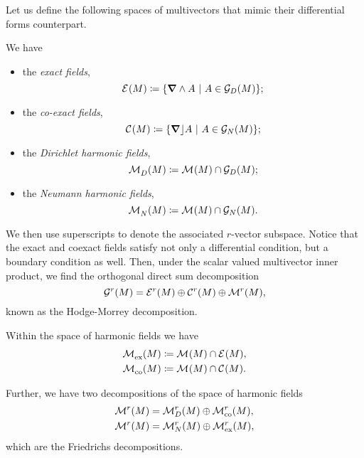 Let us define the following spaces of multivectors that mimic their differential forms counterpart.
\begin{definition}
We have
\begin{itemize}
    \item the \emph{exact fields},
    \begin{equation}
        \mathcal{E}^{}(M)\coloneqq \{\boldsymbol{\nabla} \wedge A ~\vert~ A \in \mathcal{G}_D(M)\};
    \end{equation}
    \item the \emph{co-exact fields},
    \begin{equation}
        \mathcal{C}^{}(M)\coloneqq \{\boldsymbol{\nabla} \rfloor A ~\vert~ A \in \mathcal{G}_N(M)\};
    \end{equation}
    \item the \emph{Dirichlet harmonic fields},
    \begin{equation}
        \mathcal{M}^{}_D(M)\coloneqq \mathcal{M}^{}(M) \cap \mathcal{G}_D(M);
    \end{equation}
    \item the \emph{Neumann harmonic fields},
    \begin{equation}
        \mathcal{M}^{}_N(M)\coloneqq \mathcal{M}^{}(M) \cap \mathcal{G}_N(M).
    \end{equation}
\end{itemize}
\end{definition}
We then use superscripts to denote the associated $r$-vector subspace. Notice that the exact and coexact fields satisfy not only a differential condition, but a boundary condition as well. Then, under the scalar valued multivector inner product, we find the orthogonal direct sum decomposition
\begin{equation}
\mathcal{G}^r(M) = \mathcal{E}^{r}(M) \oplus \mathcal{C}^{r}(M) \oplus \mathcal{M}^{r}(M),
\end{equation}
known as the Hodge-Morrey decomposition.
\begin{definition}
Within the space of harmonic fields we have
\begin{align}
    \mathcal{M}^{}_{\textrm{ex}}(M) &\coloneqq \mathcal{M}^{}(M)\cap \mathcal{E}^{}(M),\\
    \mathcal{M}^{}_{\textrm{co}}(M) &\coloneqq \mathcal{M}^{}(M) \cap \mathcal{C}^{}(M).
\end{align}
\end{definition}
Further, we have two decompositions of the space of harmonic fields 
\begin{align}
    \mathcal{M}^{r}(M) &= \mathcal{M}^{r}_D(M) \oplus \mathcal{M}^{r}_{\textrm{co}}(M), \\
    \mathcal{M}^{r}(M) &= \mathcal{M}^{r}_N(M) \oplus \mathcal{M}^{r}_{\textrm{ex}}(M),
\end{align}
which are the Friedrichs decompositions.

